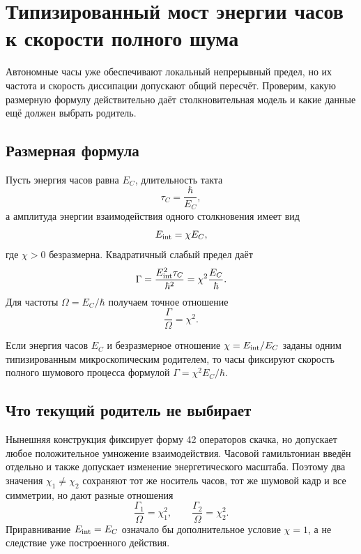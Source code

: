 \chapter{Типизированный мост энергии часов к скорости полного шума}
\label{ch:v8-typed-clock-energy-to-noise-rate-anchor-gate}

Автономные часы уже обеспечивают локальный непрерывный предел, но их
частота и скорость диссипации допускают общий пересчёт. Проверим, какую
размерную формулу действительно даёт столкновительная модель и какие данные
ещё должен выбрать родитель.

\section{Размерная формула}

Пусть энергия часов равна $E_C$, длительность такта
\begin{equation}
 \tau_C=\frac{\hbar}{E_C},
\end{equation}
а амплитуда энергии взаимодействия одного столкновения имеет вид
\begin{equation}
 E_{\rm int}=\chi E_C,
\end{equation}
где $\chi>0$ безразмерна. Квадратичный слабый предел даёт
\begin{equation}
 \Gamma=\frac{E_{\rm int}^2\tau_C}{\hbar^2}
 =\chi^2\frac{E_C}{\hbar}.
 \label{eq:v8-typed-clock-noise-rate}
\end{equation}
Для частоты $\Omega=E_C/\hbar$ получаем точное отношение
\begin{equation}
 \boxed{\frac{\Gamma}{\Omega}=\chi^2.}
 \label{eq:v8-clock-rate-relative-calibration}
\end{equation}

\begin{theorem}
Если энергия часов $E_C$ и безразмерное отношение
$\chi=E_{\rm int}/E_C$ заданы одним типизированным микроскопическим
родителем, то часы фиксируют скорость полного шумового процесса формулой
$\Gamma=\chi^2E_C/\hbar$.
\end{theorem}

\section{Что текущий родитель не выбирает}

Нынешняя конструкция фиксирует форму 42 операторов скачка, но допускает
любое положительное умножение взаимодействия. Часовой гамильтониан введён
отдельно и также допускает изменение энергетического масштаба. Поэтому два
значения $\chi_1\ne\chi_2$ сохраняют тот же носитель часов, тот же шумовой
кадр и все симметрии, но дают разные отношения
\begin{equation}
 \frac{\Gamma_1}{\Omega}=\chi_1^2,
 \qquad
 \frac{\Gamma_2}{\Omega}=\chi_2^2.
\end{equation}
Приравнивание $E_{\rm int}=E_C$ означало бы дополнительное условие
$\chi=1$, а не следствие уже построенного действия.


